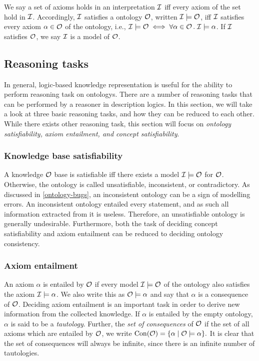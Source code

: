 We say a set of axioms holds in an interpretation $\mathcal{I}$ iff every axiom of the set hold in $\mathcal{I}$. Accordingly, $\mathcal{I}$ satisfies a ontology $\mathcal{O}$, written $\mathcal{I} \models \mathcal{O}$, iff $\mathcal{I}$ satisfies every axiom $\alpha \in \mathcal{O}$ of the ontology, i.e., $\mathcal{I} \models \mathcal{O} \iff \forall \alpha \in \mathcal{O} \, . \; \mathcal{I} \models \alpha$. If $\mathcal{I}$ satisfies $\mathcal{O}$, we say $\mathcal{I}$ is a model of $\mathcal{O}$.

\subsection{Reasoning tasks} \label{reasoning-tasks}

In general, logic-based knowledge representation is useful for the ability to perform reasoning task on ontologys. There are a number of reasoning tasks that can be performed by a reasoner in description logics. In this section, we will take a look at three basic reasoning tasks, and how they can be reduced to each other. While there exists other reasoning task, this section will focus on \emph{ontology satisfiability,} \emph{axiom entailment, and concept satisfiability}.

\subsubsection{Knowledge base satisfiability} \label{knowledge-base-satisfiability}

A knowledge $\mathcal{O}$ base is satisfiable iff there exists a model $\mathcal{I} \models \mathcal{O}$ for $\mathcal{O}$. Otherwise, the ontology is called unsatisfiable, inconsistent, or contradictory. As discussed in \cref{ontology-bugs}, an inconsistent ontology can be a sign of modelling errors. An inconsistent ontology entailed every statement, and as such all information extracted from it is useless. Therefore, an unsatisfiable ontology is generally undesirable. Furthermore, both the task of deciding concept satisfiability and axiom entailment can be reduced to deciding ontology consistency.

\subsubsection{Axiom entailment} \label{axiom-entailment}

An axiom $\alpha$ is entailed by $\mathcal{O}$ if every model $\mathcal{I} \models \mathcal{O}$ of the ontology also satisfies the axiom $\mathcal{I} \models \alpha$. We also write this as $\mathcal{O} \models \alpha$ and say that $\alpha$ is a consequence of $\mathcal{O}$. Deciding axiom entailment is an important task in order to derive new information from the collected knowledge. If $\alpha$ is entailed by the empty ontology, $\alpha$ is said to be a \emph{tautology}. Further, the \emph{set of consequences} of $\mathcal{O}$ if the set of all axioms which are entailed by $\mathcal{O}$, we write $\mathrm{Con}(\mathcal{O}) = \{ \alpha \mid \mathcal{O} \models \alpha \}.$ It is clear that the set of consequences will always be infinite, since there is an infinite number of tautologies.


